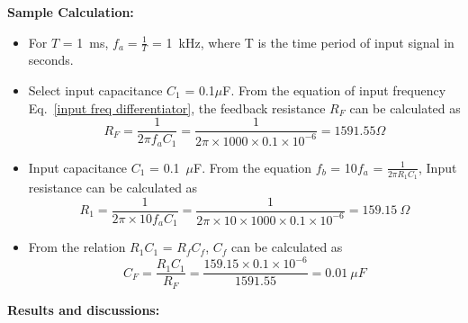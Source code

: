 \documentclass[11pt]{scrreprt}
\begin{document}
\noindent\textbf{Sample Calculation:}\\
\begin{itemize}

\item For $T$ = 1~ms, $f_a = \frac{1}{T}$ = 1~kHz, where T is the time period of input signal in seconds.

\item Select input capacitance $C_1$ = 0.1$\mu$F. From the equation of input frequency Eq.~\ref{input freq differentiator}, the feedback resistance $R_F$ can be calculated as
\begin{equation}
    R_F = \frac{1}{2\pi f_a C_1} = \frac{1}{2\pi \times 1000\times 0.1\times 10^{-6}} = 1591.55\Omega
\end{equation}
\item Input capacitance $C_1$ = 0.1~$\mu$F. From the equation $f_b$ = 10$f_a$ = $\frac{1}{2\pi R_1C_1}$, Input resistance can be calculated as
\begin{equation}
    R_1 = \frac{1}{2\pi \times 10f_a C_1} = \frac{1}{2\pi\times 10\times 1000\times 0.1\times 10^{-6}} = 159.15~\Omega
\end{equation}
\item From the relation $R_1C_1$ = $R_fC_f$, $C_f$ can be calculated as
\begin{equation}
    C_F = \frac{R_1C_1}{R_F} = \frac{159.15\times0.1\times10^{-6}}{1591.55} = 0.01~\mu F
\end{equation}
\end{itemize}
\par
\noindent\textbf{ Results and discussions:}
\end{document}
